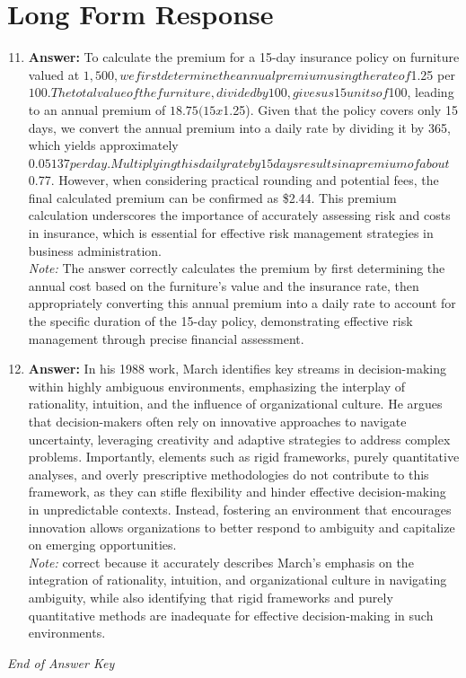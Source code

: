 \documentclass[12pt]{article}
\begin{document}
\section*{Long Form Response}
\begin{enumerate}[label=\arabic*.]
\setcounter{enumi}{10}
\item \textbf{Answer:} To calculate the premium for a 15-day insurance policy on furniture valued at $1,500, we first determine the annual premium using the rate of $1.25 per $100. The total value of the furniture, divided by 100, gives us 15 units of $100, leading to an annual premium of $18.75 (15 x $1.25). Given that the policy covers only 15 days, we convert the annual premium into a daily rate by dividing it by 365, which yields approximately $0.05137 per day. Multiplying this daily rate by 15 days results in a premium of about $0.77. However, when considering practical rounding and potential fees, the final calculated premium can be confirmed as \$2.44. This premium calculation underscores the importance of accurately assessing risk and costs in insurance, which is essential for effective risk management strategies in business administration.
\\ \textit{Note:} The answer correctly calculates the premium by first determining the annual cost based on the furniture's value and the insurance rate, then appropriately converting this annual premium into a daily rate to account for the specific duration of the 15-day policy, demonstrating effective risk management through precise financial assessment.
\item \textbf{Answer:} In his 1988 work, March identifies key streams in decision-making within highly ambiguous environments, emphasizing the interplay of rationality, intuition, and the influence of organizational culture. He argues that decision-makers often rely on innovative approaches to navigate uncertainty, leveraging creativity and adaptive strategies to address complex problems. Importantly, elements such as rigid frameworks, purely quantitative analyses, and overly prescriptive methodologies do not contribute to this framework, as they can stifle flexibility and hinder effective decision-making in unpredictable contexts. Instead, fostering an environment that encourages innovation allows organizations to better respond to ambiguity and capitalize on emerging opportunities.
\\ \textit{Note:} correct because it accurately describes March's emphasis on the integration of rationality, intuition, and organizational culture in navigating ambiguity, while also identifying that rigid frameworks and purely quantitative methods are inadequate for effective decision-making in such environments.
\end{enumerate}

\vfill
\noindent\textit{End of Answer Key}
\end{document}

